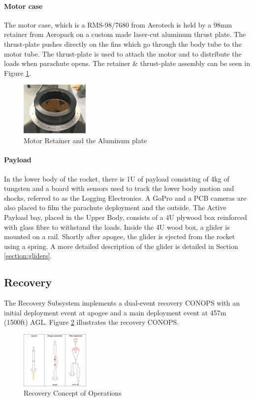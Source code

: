 \paragraph{Motor case}
\hfill \break
The motor case, which is a RMS-98/7680 from Aerotech is held by a 98mm retainer from Aeropack on a custom made laser-cut aluminum thrust plate. The thrust-plate pushes directly on the fins which go through the body tube to the motor tube. The thrust-plate is used to attach the motor and to distribute the loads when parachute opens.
 The retainer \& thrust-plate assembly can be seen in Figure \ref{f:motor_retainer_2}.
\begin{figure}[h!]
        \centering
        \includegraphics[width=0.3\textwidth]{img/motor_retainer.png}
        \caption{Motor Retainer and the Aluminum plate}
        \label{f:motor_retainer_2}
    \end{figure}


\paragraph{Payload}
\hfill \break
In the lower body of the rocket, there is 1U of payload consisting of 4kg of tungsten and a board with sensors used to track the lower body motion and shocks, referred to as the Logging Electronics. A GoPro and a PCB cameras are also placed to film the parachute deployment and the outside.
The Active Payload bay, placed in the Upper Body, consists of a 4U plywood box reinforced with glass fibre to withstand the loads. Inside the 4U wood box, a glider is mounted on a rail. Shortly after apogee, the glider is ejected from the rocket using a spring. A more detailed description of the glider is detailed in Section  \ref{section:gliders}.



\subsection{Recovery}
The Recovery Subsystem implements a dual-event recovery CONOPS with an initial deployment event at apogee and a main deployment event at 457m (1500ft) AGL. Figure \ref{f:recovery_conops} illustrates the recovery CONOPS.
\begin{figure}[h!]
 	\centering
        \includegraphics[width=0.3\textwidth]{img/recovery_conops_schema.png}
        \caption{Recovery Concept of Operations}
        \label{f:recovery_conops}
 \end{figure}

